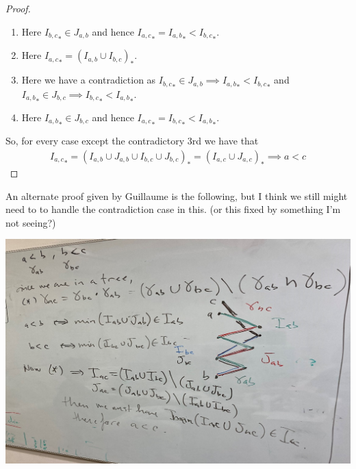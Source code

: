 \documentclass[11pt]{amsart}
\theoremstyle{definition}
\theoremstyle{remark}
\numberwithin{equation}{section}
\newcommand{\0}{\color{blue}{\mathsf{0}}}
\begin{document}
\begin{proof}
\begin{enumerate}
    \item Here ${I_{b,c}}_* \in J_{a,b}$ and hence ${I_{a,c}}_*={I_{a,b}}_*<{I_{b,c}}_*$.
    \item Here ${I_{a,c}}_* = ({I_{a,b}} \cup {I_{b,c}})_*$.
    \item Here we have a contradiction as ${I_{b,c}}_* \in J_{a,b} \implies {I_{a,b}}_*<{I_{b,c}}_*$  and ${I_{a,b}}_* \in J_{b,c} \implies {I_{b,c}}_*<{I_{a,b}}_*$.
    \item Here ${I_{a,b}}_* \in J_{b,c}$ and hence ${I_{a,c}}_*={I_{b,c}}_*<{I_{a,b}}_*$. 
\end{enumerate}
So, for every case except the contradictory $3$rd we have that \begin{align*}
    {I_{a,c}}_* = ({I_{a,b}} \cup J_{a,b} \cup {I_{b,c}} \cup J_{b,c})_* = ({I_{a,c}} \cup J_{a,c})_* \implies a < c 
\end{align*}
\end{proof}
An alternate proof given by Guillaume is the following, but I think we still might need to to handle the contradiction case in this. (or this fixed by something I'm not seeing?)
\begin{center}
\includegraphics{Images/alternate_transitivity.png}
\end{center}
\end{document}
